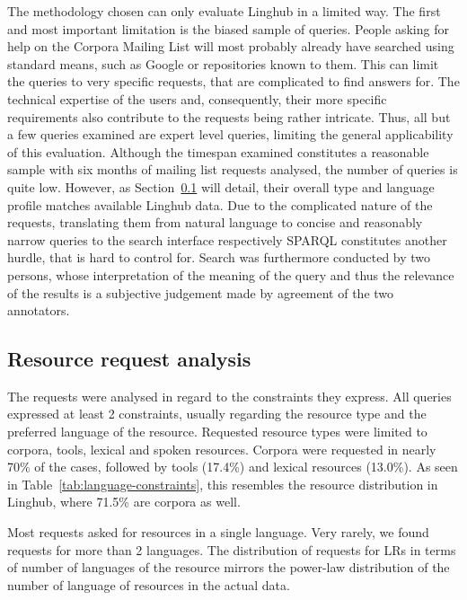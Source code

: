 \documentclass[smallextended]{svjour3}       %
\begin{document}
The methodology chosen can only evaluate Linghub in a limited way. The first and
most important limitation is the biased sample of queries. People asking for
help on the Corpora Mailing List will most probably already have searched using
standard means, such as Google or repositories known to them. This can limit the
queries to very specific requests, that are complicated to find answers for. The
technical expertise of the users and, consequently, their more specific
requirements also contribute to the requests being rather intricate. Thus, all
but a few queries examined are expert level queries, limiting the general
applicability of this evaluation. 
Although the timespan examined constitutes a reasonable sample with six months
of mailing list requests analysed, the number of queries is quite low. However,
as Section~\ref{resource-request-analysis} will detail, their overall type and language profile matches
available Linghub data.
Due to the complicated nature of the requests, translating them from natural
language to concise and reasonably narrow queries to the search interface
respectively SPARQL constitutes another hurdle, that is hard to control for. 
Search was furthermore conducted by two persons, whose interpretation of the
meaning of the query and thus the relevance of the results is a subjective
judgement made by agreement of the two annotators.

\subsection{Resource request analysis}
\label{resource-request-analysis}

The requests were analysed in regard to the constraints they express. All
queries expressed at least 2 constraints, usually regarding the resource type
and the preferred language of the resource. Requested resource types were
limited to corpora, tools, lexical and spoken resources. Corpora were requested
in nearly 70\% of the cases, followed by tools (17.4\%) and lexical resources
(13.0\%). As seen in %
Table~\ref{tab:language-constraints}, 
this resembles the resource distribution in
Linghub, where 71.5\% are corpora as well. 

Most requests asked for resources in a single language. Very rarely, we found
requests for more than 2 languages. The distribution of requests for LRs in
terms of number of languages of the resource mirrors the power-law distribution
of the number of language of resources in the actual data. 
\end{document}

